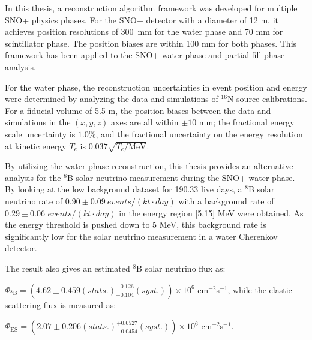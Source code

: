 In this thesis, a reconstruction algorithm framework was developed for multiple SNO+ physics phases. For the SNO+ detector with a diameter of 12 m, it achieves position resolutions of 300~mm for the water phase and 70 mm for scintillator phase. The position biases are within 100 mm for both phases. This framework has been applied to the SNO+ water phase and partial-fill phase analysis. 

For the water phase, the reconstruction uncertainties in event position and energy were determined by analyzing the data and simulations of $^{16}$N source calibrations. For a fiducial volume of 5.5 m, the position biases between the data and simulations in the $(x,y,z)$ axes are all within $\pm10$ mm; the fractional energy scale uncertainty is $1.0$\%, and the fractional uncertainty on the energy resolution at kinetic energy $T_e$ is $0.037\sqrt{T_e/\mathrm{MeV}}$.

By utilizing the water phase reconstruction, this thesis provides an alternative analysis for the $^8$B solar neutrino measurement during the SNO+ water phase. By looking at the low background dataset for 190.33 live days, a $^8$B solar neutrino rate of $0.90\pm0.09~events/(kt\cdot day)$ with a background rate of $0.29\pm 0.06$ $events/(kt\cdot day)$ in the energy region [5,15] MeV were obtained. As the energy threshold is pushed down to 5 MeV, this background rate is significantly low for the solar neutrino measurement in a water Cherenkov detector.

The result also gives an estimated $^8$B solar neutrino flux as: 

$\Phi_{\mathrm{^8B}}=(4.62 \pm 0.459 (stats.)^{+0.126}_{-0.104}(syst.))\times10^6$ cm$^{-2}$s$^{-1}$, 
while the elastic scattering flux is measured as: 

$\Phi_{\mathrm{ES}}=(2.07 \pm 0.206(stats.)^{+0.0527}_{-0.0454}(syst.))\times10^6$ cm$^{-2}$s$^{-1}$.
